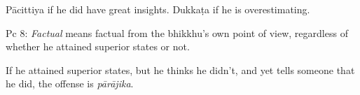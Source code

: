 \begin{exam}{\autoExamName}
\begin{problem*}
\begin{parts}
  \begin{solution}
    Pācittiya if he did have great insights. Dukkaṭa if he is overestimating.

    Pc 8: \emph{Factual} means factual from the bhikkhu's own point of view, regardless of whether he attained superior states or not.

    If he attained superior states, but he thinks he didn't, and yet tells someone that he did, the offense is \emph{pārājika}.
  \end{solution}

  \bigskip

\end{parts}

\end{problem*}

\end{exam}

